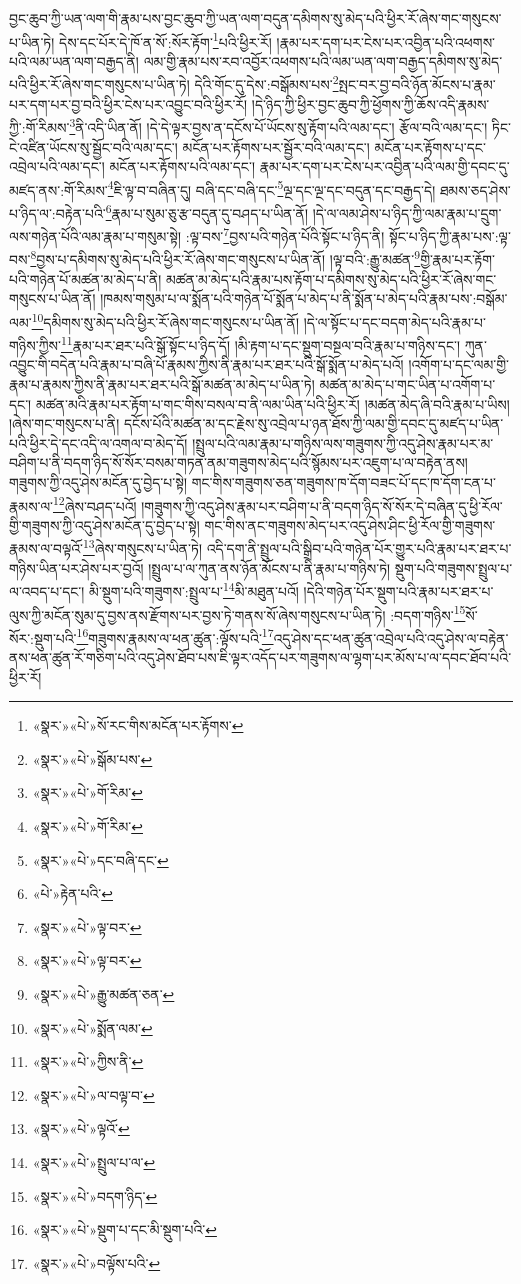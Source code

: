 བྱང་ཆུབ་ཀྱི་ཡན་ལག་གི་རྣམ་པས་བྱང་ཆུབ་ཀྱི་ཡན་ལག་བདུན་དམིགས་སུ་མེད་པའི་ཕྱིར་རོ་ཞེས་གང་གསུངས་པ་ཡིན་ཏེ། དེས་དང་པོར་དེ་ཁོ་ན་སོ་:སོར་རྟོག་\footnote{«སྣར་»«པེ་»སོ་རང་གིས་མངོན་པར་རྟོགས་}པའི་ཕྱིར་རོ། །རྣམ་པར་དག་པར་ངེས་པར་འབྱིན་པའི་འཕགས་པའི་ལམ་ཡན་ལག་བརྒྱད་ནི། ལམ་གྱི་རྣམ་པས་རབ་འབྱོར་འཕགས་པའི་ལམ་ཡན་ལག་བརྒྱད་དམིགས་སུ་མེད་པའི་ཕྱིར་རོ་ཞེས་གང་གསུངས་པ་ཡིན་ཏེ། དེའི་གོང་དུ་དེས་:བསྒོམས་པས་\footnote{«སྣར་»«པེ་»སྒོམ་པས་}སྤང་བར་བྱ་བའི་ཉོན་མོངས་པ་རྣམ་པར་དག་པར་བྱ་བའི་ཕྱིར་ངེས་པར་འབྱུང་བའི་ཕྱིར་རོ། །དེ་ཉིད་ཀྱི་ཕྱིར་བྱང་ཆུབ་ཀྱི་ཕྱོགས་ཀྱི་ཆོས་འདི་རྣམས་ཀྱི་:གོ་རིམས་\footnote{«སྣར་»«པེ་»གོ་རིམ་}ནི་འདི་ཡིན་ནོ། །དེ་དེ་ལྟར་བྱས་ན་དངོས་པོ་ཡོངས་སུ་རྟོག་པའི་ལམ་དང་། རྩོལ་བའི་ལམ་དང་། ཏིང་ངེ་འཛིན་ཡོངས་སུ་སྦྱོང་བའི་ལམ་དང་། མངོན་པར་རྟོགས་པར་སྦྱོར་བའི་ལམ་དང་། མངོན་པར་རྟོགས་པ་དང་འབྲེལ་པའི་ལམ་དང་། མངོན་པར་རྟོགས་པའི་ལམ་དང་། རྣམ་པར་དག་པར་ངེས་པར་འབྱིན་པའི་ལམ་གྱི་དབང་དུ་མཛད་ནས་:གོ་རིམས་\footnote{«སྣར་»«པེ་»གོ་རིམ་}ཇི་ལྟ་བ་བཞིན་དུ། བཞི་དང་བཞི་དང་\footnote{«སྣར་»«པེ་»དང་བཞི་དང་}ལྔ་དང་ལྔ་དང་བདུན་དང་བརྒྱད་དེ། ཐམས་ཅད་ཤེས་པ་ཉིད་ལ་:བརྟེན་པའི་\footnote{«པེ་»རྟེན་པའི་}རྣམ་པ་སུམ་ཅུ་རྩ་བདུན་དུ་བཤད་པ་ཡིན་ནོ། །དེ་ལ་ལམ་ཤེས་པ་ཉིད་ཀྱི་ལམ་རྣམ་པ་དྲུག་ལས་གཉེན་པོའི་ལམ་རྣམ་པ་གསུམ་སྟེ། :ལྟ་བས་\footnote{«སྣར་»«པེ་»ལྟ་བར་}བྱས་པའི་གཉེན་པོའི་སྟོང་པ་ཉིད་ནི། སྟོང་པ་ཉིད་ཀྱི་རྣམ་པས་:ལྟ་བས་\footnote{«སྣར་»«པེ་»ལྟ་བར་}བྱས་པ་དམིགས་སུ་མེད་པའི་ཕྱིར་རོ་ཞེས་གང་གསུངས་པ་ཡིན་ནོ། །ལྟ་བའི་:རྒྱུ་མཚན་\footnote{«སྣར་»«པེ་»རྒྱུ་མཚན་ཅན་}གྱི་རྣམ་པར་རྟོག་པའི་གཉེན་པོ་མཚན་མ་མེད་པ་ནི། མཚན་མ་མེད་པའི་རྣམ་པས་རྟོག་པ་དམིགས་སུ་མེད་པའི་ཕྱིར་རོ་ཞེས་གང་གསུངས་པ་ཡིན་ནོ། །ཁམས་གསུམ་པ་ལ་སྨོན་པའི་གཉེན་པོ་སྨོན་པ་མེད་པ་ནི་སྨོན་པ་མེད་པའི་རྣམ་པས་:བསྒོམ་ལམ་\footnote{«སྣར་»«པེ་»སྨོན་ལམ་}དམིགས་སུ་མེད་པའི་ཕྱིར་རོ་ཞེས་གང་གསུངས་པ་ཡིན་ནོ། །དེ་ལ་སྟོང་པ་དང་བདག་མེད་པའི་རྣམ་པ་གཉིས་ཀྱིས་\footnote{«སྣར་»«པེ་»ཀྱིས་ནི་}རྣམ་པར་ཐར་པའི་སྒོ་སྟོང་པ་ཉིད་དོ། །མི་རྟག་པ་དང་སྡུག་བསྔལ་བའི་རྣམ་པ་གཉིས་དང་། ཀུན་འབྱུང་གི་བདེན་པའི་རྣམ་པ་བཞི་པོ་རྣམས་ཀྱིས་ནི་རྣམ་པར་ཐར་པའི་སྒོ་སྨོན་པ་མེད་པའོ། །འགོག་པ་དང་ལམ་གྱི་རྣམ་པ་རྣམས་ཀྱིས་ནི་རྣམ་པར་ཐར་པའི་སྒོ་མཚན་མ་མེད་པ་ཡིན་ཏེ། མཚན་མ་མེད་པ་གང་ཡིན་པ་འགོག་པ་དང་། མཚན་མའི་རྣམ་པར་རྟོག་པ་གང་གིས་བསལ་བ་ནི་ལམ་ཡིན་པའི་ཕྱིར་རོ། །མཚན་མེད་ཞི་བའི་རྣམ་པ་ཡིས། །ཞེས་གང་གསུངས་པ་ནི། དངོས་པོའི་མཚན་མ་དང་རྗེས་སུ་འབྲེལ་པ་ཉན་ཐོས་ཀྱི་ལམ་གྱི་དབང་དུ་མཛད་པ་ཡིན་པའི་ཕྱིར་དེ་དང་འདི་ལ་འགལ་བ་མེད་དོ། །སྤྲུལ་པའི་ལམ་རྣམ་པ་གཉིས་ལས་གཟུགས་ཀྱི་འདུ་ཤེས་རྣམ་པར་མ་བཤིག་པ་ནི་བདག་ཉིད་སོ་སོར་བསམ་གཏན་ནམ་གཟུགས་མེད་པའི་སྙོམས་པར་འཇུག་པ་ལ་བརྟེན་ནས། གཟུགས་ཀྱི་འདུ་ཤེས་མངོན་དུ་བྱེད་པ་སྟེ། གང་གིས་གཟུགས་ཅན་གཟུགས་ཁ་དོག་བཟང་པོ་དང་ཁ་དོག་ངན་པ་རྣམས་ལ་\footnote{«སྣར་»«པེ་»ལ་བལྟ་བ་}ཞེས་བཤད་པའོ། །གཟུགས་ཀྱི་འདུ་ཤེས་རྣམ་པར་བཤིག་པ་ནི་བདག་ཉིད་སོ་སོར་དེ་བཞིན་དུ་ཕྱི་རོལ་གྱི་གཟུགས་ཀྱི་འདུ་ཤེས་མངོན་དུ་བྱེད་པ་སྟེ། གང་གིས་ནང་གཟུགས་མེད་པར་འདུ་ཤེས་ཤིང་ཕྱི་རོལ་གྱི་གཟུགས་རྣམས་ལ་བལྟའོ་\footnote{«སྣར་»«པེ་»ལྟའོ་}ཞེས་གསུངས་པ་ཡིན་ཏེ། འདི་དག་ནི་སྤྲུལ་པའི་སྒྲིབ་པའི་གཉེན་པོར་གྱུར་པའི་རྣམ་པར་ཐར་པ་གཉིས་ཡིན་པར་ཤེས་པར་བྱའོ། །སྤྲུལ་པ་ལ་ཀུན་ནས་ཉོན་མོངས་པ་ནི་རྣམ་པ་གཉིས་ཏེ། སྡུག་པའི་གཟུགས་སྤྲུལ་པ་ལ་འབད་པ་དང་། མི་སྡུག་པའི་གཟུགས་:སྤྲུལ་པ་\footnote{«སྣར་»«པེ་»སྤྲུལ་པ་ལ་}མི་མཐུན་པའོ། །དེའི་གཉེན་པོར་སྡུག་པའི་རྣམ་པར་ཐར་པ་ལུས་ཀྱི་མངོན་སུམ་དུ་བྱས་ནས་རྫོགས་པར་བྱས་ཏེ་གནས་སོ་ཞེས་གསུངས་པ་ཡིན་ཏེ། :བདག་གཉིས་\footnote{«སྣར་»«པེ་»བདག་ཉིད་}སོ་སོར་:སྡུག་པའི་\footnote{«སྣར་»«པེ་»སྡུག་པ་དང་མི་སྡུག་པའི་}གཟུགས་རྣམས་ལ་ཕན་ཚུན་:ལྟོས་པའི་\footnote{«སྣར་»«པེ་»བལྟོས་པའི་}འདུ་ཤེས་དང་ཕན་ཚུན་འབྲེལ་པའི་འདུ་ཤེས་ལ་བརྟེན་ནས་ཕན་ཚུན་རོ་གཅིག་པའི་འདུ་ཤེས་ཐོབ་པས་ཇི་ལྟར་འདོད་པར་གཟུགས་ལ་ལྷག་པར་མོས་པ་ལ་དབང་ཐོབ་པའི་ཕྱིར་རོ། 